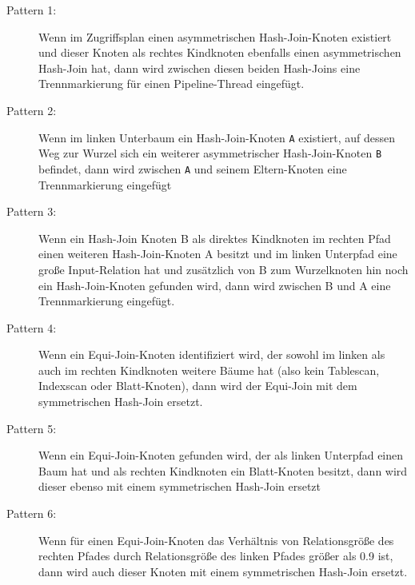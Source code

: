 \begin{description}
\item[Pattern 1:] Wenn im Zugriffsplan einen asymmetrischen Hash-Join-Knoten existiert und dieser Knoten als rechtes Kindknoten ebenfalls einen asymmetrischen Hash-Join hat, dann wird zwischen diesen beiden Hash-Joins eine Trennmarkierung für einen Pipeline-Thread eingefügt.
\item[Pattern 2:] Wenn im linken Unterbaum ein Hash-Join-Knoten \texttt{A} existiert, auf dessen Weg zur Wurzel sich ein weiterer asymmetrischer Hash-Join-Knoten \texttt{B} befindet, dann wird zwischen \texttt{A} und seinem Eltern-Knoten eine Trennmarkierung eingefügt
\item[Pattern 3:] Wenn ein Hash-Join Knoten B als direktes Kindknoten im rechten Pfad einen weiteren Hash-Join-Knoten A besitzt und im linken Unterpfad eine große Input-Relation hat und zusätzlich von B zum Wurzelknoten hin noch ein Hash-Join-Knoten gefunden wird, dann wird zwischen B und A eine Trennmarkierung eingefügt.
\item[Pattern 4:] Wenn ein Equi-Join-Knoten identifiziert wird, der sowohl im linken als auch im rechten Kindknoten weitere Bäume hat (also kein Tablescan, Indexscan oder Blatt-Knoten), dann wird der Equi-Join mit dem symmetrischen Hash-Join ersetzt.
\item[Pattern 5:] Wenn ein Equi-Join-Knoten gefunden wird, der als linken Unterpfad einen Baum hat und als rechten Kindknoten ein Blatt-Knoten besitzt, dann wird dieser ebenso mit einem symmetrischen Hash-Join ersetzt
\item[Pattern 6:] Wenn für einen Equi-Join-Knoten das Verhältnis von Relationsgröße des rechten Pfades durch Relationsgröße des linken Pfades größer als 0.9 ist, dann wird auch dieser Knoten mit einem symmetrischen Hash-Join ersetzt.
\end{description}

